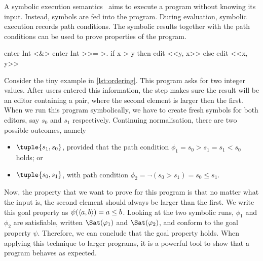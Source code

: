 A symbolic execution semantics~\cite{King1975,Boyer1975} aims to execute a program without knowing its input.
Instead, symbols are fed into the program.
During evaluation, symbolic execution records path conditions.
The symbolic results together with the path conditions can be used to prove properties of the program.

\begin{TASK}[
    float=ht,
    caption={Ordering of tuple elements.},
    captionpos=b,
    label=lst:ordering]
  enter Int <&> enter Int >>= >. if x > y then edit <<y, x>> else edit <<x, y>>
\end{TASK}

Consider the tiny example in \cref{lst:ordering}.
This program asks for two integer values.
After users entered this information, the step makes sure the result will be an editor containing a pair,
where the second element is larger then the first.
When we run this program symbolically, we have to create fresh symbols for both editors, say $s_0$ and $s_1$ respectively.
Continuing normalisation, there are two possible outcomes, namely
\begin{itemize}
  \item $\tuple{s_1,s_0}$, provided that the path condition $\phi_1 = s_0 > s_1 = s_1 < s_0$ holds; or
  \item $\tuple{s_0,s_1}$, with path condition $\phi_2 = \lnot (s_0 > s_1) = s_0 \leq s_1$.
\end{itemize}

Now, the property that we want to prove for this program is that no matter what the input is, the second element should always be larger than the first.
We write this goal property as $\psi(\langle a, b\rangle)= a \leq b$.
Looking at the two symbolic runs, $\phi_1$ and $\phi_2$ are satisfiable, written $\Sat(\phi_1)$ and $\Sat(\phi_2)$, and conform to the goal property $\psi$.
Therefore, we can conclude that the goal property holds.
%
When applying this technique to larger programs, it is a powerful tool to show that a program behaves as expected.


